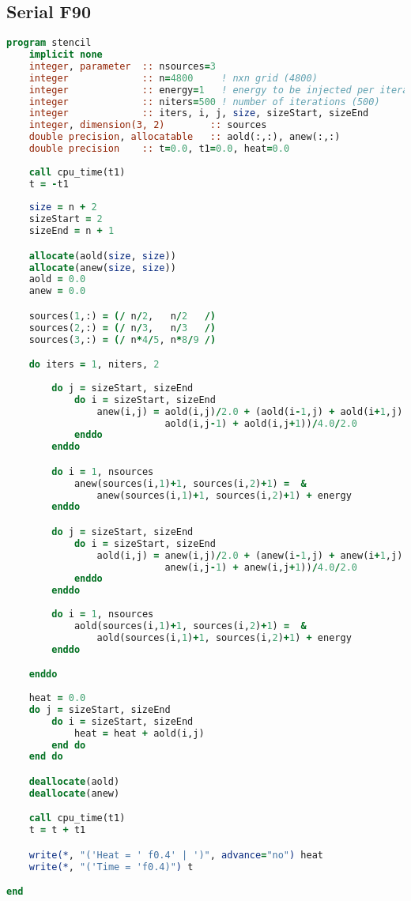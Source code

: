 \subsection{Serial F90}
\begin{lstlisting}[language=Fortran, caption={Serial F90 implementation of the stencil test case.}]
program stencil
    implicit none
    integer, parameter  :: nsources=3
    integer             :: n=4800     ! nxn grid (4800)
    integer             :: energy=1   ! energy to be injected per iteration (1)
    integer             :: niters=500 ! number of iterations (500)
    integer             :: iters, i, j, size, sizeStart, sizeEnd
    integer, dimension(3, 2)        :: sources
    double precision, allocatable   :: aold(:,:), anew(:,:)
    double precision    :: t=0.0, t1=0.0, heat=0.0
            
    call cpu_time(t1)
    t = -t1
    
    size = n + 2
    sizeStart = 2
    sizeEnd = n + 1

    allocate(aold(size, size))
    allocate(anew(size, size))
    aold = 0.0
    anew = 0.0

    sources(1,:) = (/ n/2,   n/2   /)
    sources(2,:) = (/ n/3,   n/3   /)
    sources(3,:) = (/ n*4/5, n*8/9 /)

    do iters = 1, niters, 2
        
        do j = sizeStart, sizeEnd
            do i = sizeStart, sizeEnd
                anew(i,j) = aold(i,j)/2.0 + (aold(i-1,j) + aold(i+1,j) +  &
                            aold(i,j-1) + aold(i,j+1))/4.0/2.0
            enddo
        enddo

        do i = 1, nsources
            anew(sources(i,1)+1, sources(i,2)+1) =  &
                anew(sources(i,1)+1, sources(i,2)+1) + energy
        enddo

        do j = sizeStart, sizeEnd
            do i = sizeStart, sizeEnd
                aold(i,j) = anew(i,j)/2.0 + (anew(i-1,j) + anew(i+1,j) +  &
                            anew(i,j-1) + anew(i,j+1))/4.0/2.0
            enddo
        enddo
        
        do i = 1, nsources
            aold(sources(i,1)+1, sources(i,2)+1) =  &
                aold(sources(i,1)+1, sources(i,2)+1) + energy
        enddo

    enddo
   
    heat = 0.0
    do j = sizeStart, sizeEnd
        do i = sizeStart, sizeEnd
            heat = heat + aold(i,j)
        end do
    end do

    deallocate(aold)
    deallocate(anew)

    call cpu_time(t1)
    t = t + t1

    write(*, "('Heat = ' f0.4' | ')", advance="no") heat
    write(*, "('Time = 'f0.4)") t

end
\end{lstlisting}




